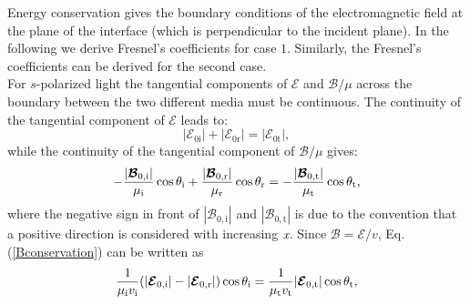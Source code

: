 Energy conservation gives the boundary conditions of the electromagnetic field at the plane of the interface (which is perpendicular to the incident plane). In the following we derive Fresnel's coefficients for case $1$. Similarly, the Fresnel's coefficients can be derived for the second case.\\ 
\indent For $s$-polarized light the tangential components of $\boldsymbol{\mathcal{E}}$ and $\boldsymbol{\mathcal{B}}/\mu$ across the boundary between the two different media must be continuous. The continuity of the tangential component of $\boldsymbol{\mathcal{E}}$ leads to:
\begin{equation}\label{Econservation}
|\boldsymbol{\mathcal{E}}_{0\textrm{i}}|+|\boldsymbol{\mathcal{E}}_{0\textrm{r}}|= |\boldsymbol{\mathcal{E}}_{0\textrm{t}}|,
\end{equation} 
while the continuity of the tangential component of $\boldsymbol{\mathcal{B}}/\mu$ gives:
\begin{equation}\label{Bconservation}
-\frac{|\boldsymbol{\mathcal{B}}_{0,\textrm{i}}|}{\mu_\textrm{i}}\cos\theta_{\textrm{i}}+\frac{|\boldsymbol{\mathcal{B}}_{0,\textrm{r}}|}{\mu_\textrm{r}}\cos\theta_{\textrm{r}} = 
-\frac{|\boldsymbol{\mathcal{B}}_{0,\textrm{t}}|}{\mu_\textrm{t}}\cos\theta_{\textrm{t}},
\end{equation}
where the negative sign in front of $|\boldsymbol{\mathcal{B}}_{0,\textrm{i}}|$ and $|\boldsymbol{\mathcal{B}}_{0,\textrm{t}}|$ is due to the convention that a positive direction is considered with increasing $\textit{x}$.
Since $\boldsymbol{\mathcal{B}} = \boldsymbol{\mathcal{E}}/v$, Eq. (\ref{Bconservation}) can be written as 
\begin{equation}
\frac{1}{\mu_{\textrm{i}}v_{\textrm{i}}}(|\boldsymbol{\mathcal{E}}_{0,\textrm{i}}|-|\boldsymbol{\mathcal{E}}_{0,\textrm{r}}|)\cos\theta_{\textrm{i}} = \frac{1}{\mu_{\textrm{t}}v_{\textrm{t}}}|\boldsymbol{\mathcal{E}}_{0,\textrm{t}}|\cos\theta_{\textrm{t}},
\end{equation}

